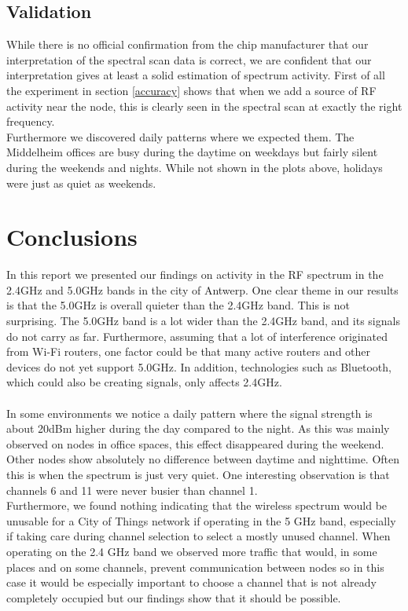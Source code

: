 \documentclass[a4paper, 11pt]{article}
\begin{document}
\subsection{Validation}
While there is no official confirmation from the chip manufacturer that our interpretation of the spectral scan data is correct, we are confident that our interpretation gives at least a solid estimation of spectrum activity. First of all the experiment in section \ref{accuracy} shows that when we add a source of RF activity near the node, this is clearly seen in the spectral scan at exactly the right frequency. \\
Furthermore we discovered daily patterns where we expected them. The Middelheim offices are busy during the daytime on weekdays but fairly silent during the weekends and nights. While not shown in the plots above, holidays were just as quiet as weekends.
\section{Conclusions}
In this report we presented our findings on activity in the RF spectrum in the 2.4GHz and 5.0GHz bands in the city of Antwerp. One clear theme in our results is that the 5.0GHz is overall quieter than the 2.4GHz band. This is not surprising. The 5.0GHz band is a lot wider than the 2.4GHz band, and its signals do not carry as far. Furthermore, assuming that a lot of interference originated from Wi-Fi routers, one factor could be that many active routers and other devices do not yet support 5.0GHz. In addition, technologies such as Bluetooth, which could also be creating signals, only affects 2.4GHz.\\ \\
In some environments we notice a daily pattern where the signal strength is about 20dBm higher during the day compared to the night. As this was mainly observed on nodes in office spaces, this effect disappeared during the weekend. Other nodes show absolutely no difference between daytime and nighttime. Often this is when the spectrum is just very quiet. One interesting observation is that channels 6 and 11 were never busier than channel 1. \\
Furthermore, we found nothing indicating that the wireless spectrum would be unusable for a City of Things network if operating in the 5 GHz band, especially if taking care during channel selection to select a mostly unused channel. When operating on the 2.4 GHz band we observed more traffic that would, in some places and on some channels, prevent communication between nodes so in this case it would be especially important to choose a channel that is not already completely occupied but our findings show that it should be possible.






\end{document}
